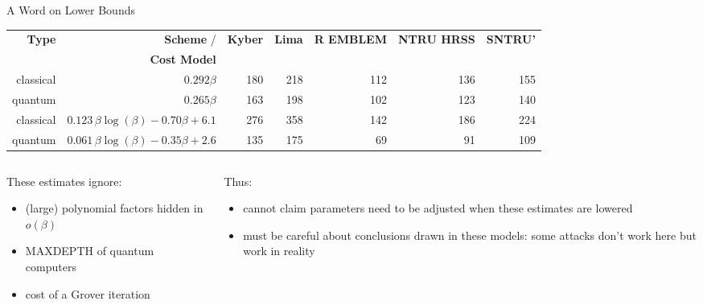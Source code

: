 \documentclass[xcolor=table,10pt,aspectratio=169]{beamer}
\begin{document}
\begin{frame}[label={sec:org191c4dc}]{A Word on Lower Bounds}

\begin{scriptsize}
\begin{center}
\begin{tabular}{rrrrrrr}
\textbf{Type} & \textbf{Scheme}      / & \textbf{Kyber} & \textbf{Lima} & \textbf{R EMBLEM} & \textbf{NTRU HRSS} & \textbf{SNTRU’}\\
 & \textbf{Cost Model} &  &  &  &  & \\
\hline
classical & \(0.292\beta\) \cite{USENIX:ADPS16} & 180 & 218 & 112 & 136 & 155\\
quantum & \(0.265\beta\) \cite{USENIX:ADPS16} & 163 & 198 & 102 & 123 & 140\\
classical & \(0.123\,\beta\log(\beta) -0.70\beta +  6.1\) \cite{C:ANSS18} & 276 & 358 & 142 & 186 & 224\\
quantum & \(0.061\,\beta\log(\beta) -0.35\beta + 2.6\) \cite{C:ANSS18} & 135 & 175 & 69 & 91 & 109\\
\end{tabular}

\end{center}
\end{scriptsize}

\begin{columns}[t]
\begin{column}{0.5\columnwidth}
These estimates ignore:

\begin{itemize}
\item (large) polynomial factors hidden in \(o(\beta)\)
\item MAXDEPTH of quantum computers
\item cost of a Grover iteration
\end{itemize}
\end{column}

\begin{column}{0.5\columnwidth}
Thus:

\begin{itemize}
\item cannot claim parameters need to be adjusted when these estimates are lowered
\item must be careful about conclusions drawn in these models: some attacks don’t work here but work in reality
\end{itemize}
\end{column}
\end{columns}
\end{frame}
\end{document}

